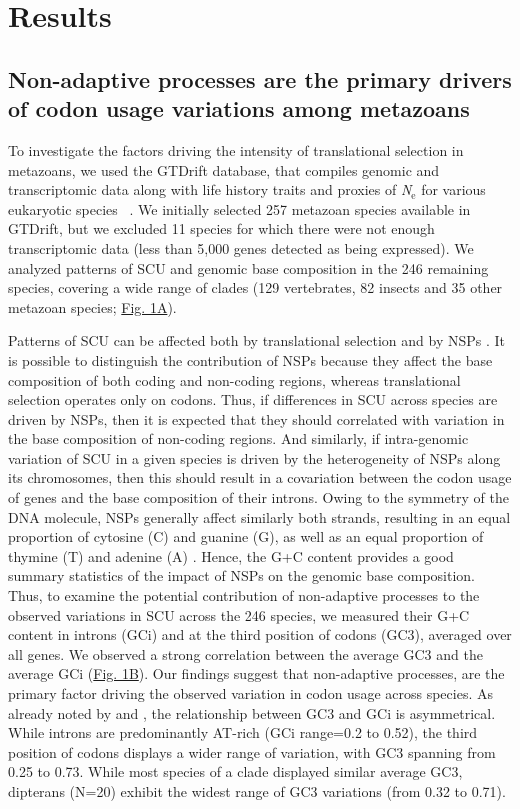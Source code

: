\section{Results}\label{sec:Results}

\subsection{Non-adaptive processes are the primary drivers of codon usage variations among metazoans}
\label{subsec:nonadapt}

To investigate the factors driving the intensity of translational selection in metazoans, we used the GTDrift database, that compiles genomic and transcriptomic data along with life history traits and proxies of \textit{N}$_{\text{e}}$ for various eukaryotic species ~\citep{benitiere_gtdrift_2024}. We initially selected 257 metazoan species available in GTDrift, but we excluded 11 species for which there were not enough transcriptomic data (less than 5,000 genes detected as being expressed). We analyzed patterns of SCU and genomic base composition in the 246 remaining species, covering a wide range of clades (129 vertebrates, 82 insects and 35 other metazoan species; \hyperref[fig:CU1]{Fig. 1A}). 

Patterns of SCU can be affected both by translational selection and by NSPs \citep{sharp_codon_1993}. It is possible to distinguish the contribution of NSPs because they affect the base composition of both coding and non-coding regions, whereas translational selection operates only on codons. Thus, if differences in SCU across species are driven by NSPs, then it is expected that they should correlated with variation in the base composition of non-coding regions. And similarly, if intra-genomic variation of SCU in a given species is driven by the heterogeneity of NSPs along its chromosomes, then this should result in a covariation between the codon usage of genes and the base composition of their introns. Owing to the symmetry of the DNA molecule, NSPs generally affect similarly both strands, resulting in an equal proportion of cytosine (C) and guanine (G), as well as an equal proportion of thymine (T) and adenine (A) \citep{lobry_properties_1995}. Hence, the G+C content provides a good summary statistics of the impact of NSPs on the genomic base composition. Thus, to examine the potential contribution of non-adaptive processes to the observed variations in SCU across the 246 species, we measured their G+C content in introns (GCi) and at the third position of codons (GC3), averaged over all genes. We observed a strong correlation between the average GC3 and the average GCi (\hyperref[fig:CU1]{Fig. 1B}). Our findings suggest that non-adaptive processes, are the primary factor driving the observed variation in codon usage across species. As already noted by \citet{vinogradov_dna_2003} and \citet{amit_differential_2012}, the relationship between GC3 and GCi is asymmetrical. While introns are predominantly AT-rich (GCi range=0.2 to 0.52), the third position of codons displays a wider range of variation, with GC3 spanning from 0.25 to 0.73. While most species of a clade displayed similar average GC3, dipterans (N=20) exhibit the widest range of GC3 variations (from 0.32 to 0.71).

